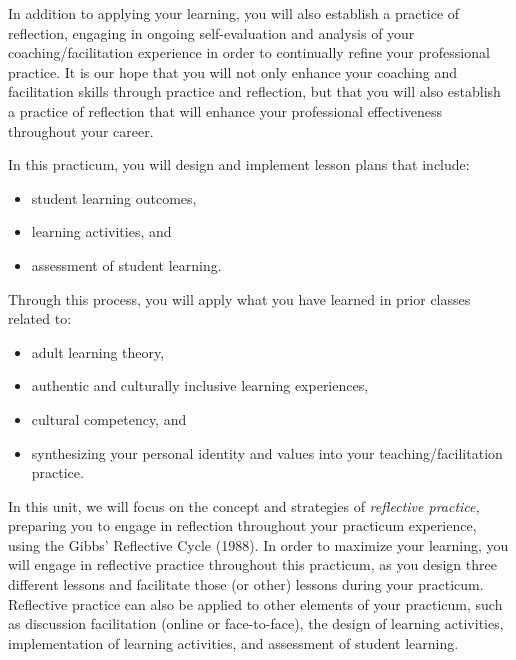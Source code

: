 \documentclass[
]{book}
\providecommand{\tightlist}{%
  \setlength{\itemsep}{0pt}\setlength{\parskip}{0pt}}
\begin{document}
In addition to applying your learning, you will also establish a practice of reflection, engaging in ongoing self-evaluation and analysis of your coaching/facilitation experience in order to continually refine your professional practice. It is our hope that you will not only enhance your coaching and facilitation skills through practice and reflection, but that you will also establish a practice of reflection that will enhance your professional effectiveness throughout your career.

In this practicum, you will design and implement lesson plans that include:

\begin{itemize}
\tightlist
\item
  student learning outcomes,\\
\item
  learning activities, and\\
\item
  assessment of student learning.
\end{itemize}

Through this process, you will apply what you have learned in prior classes related to:

\begin{itemize}
\tightlist
\item
  adult learning theory,\\
\item
  authentic and culturally inclusive learning experiences,\\
\item
  cultural competency, and\\
\item
  synthesizing your personal identity and values into your teaching/facilitation practice.
\end{itemize}

In this unit, we will focus on the concept and strategies of \emph{reflective practice,} preparing you to engage in reflection throughout your practicum experience, using the Gibbs' Reflective Cycle (1988). In order to maximize your learning, you will engage in reflective practice throughout this practicum, as you design three different lessons and facilitate those (or other) lessons during your practicum. Reflective practice can also be applied to other elements of your practicum, such as discussion facilitation (online or face-to-face), the design of learning activities, implementation of learning activities, and assessment of student learning.
\end{document}
